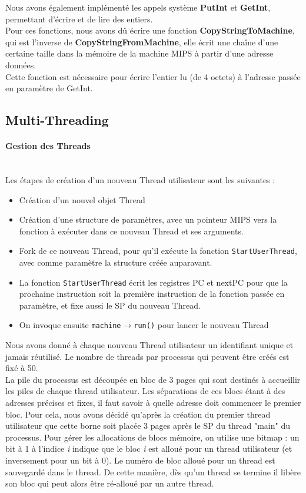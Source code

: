 \documentclass{report}
\newcommand{\myparagraph}[1]{\paragraph*{#1}\mbox{}\\}
\begin{document}
Nous avons également implémenté les appels système \textbf{PutInt} et \textbf{GetInt}, permettant d'écrire et de lire des entiers.\\
Pour ces fonctions, nous avons dû écrire une fonction \textbf{CopyStringToMachine}, qui est l'inverse de \textbf{CopyStringFromMachine}, elle écrit une chaîne d'une certaine taille dans la mémoire de la machine MIPS à partir d'une adresse données.\\
Cette fonction est nécessaire pour écrire l'entier lu (de 4 octets) à l'adresse passée en paramètre de GetInt.
\subsection*{Multi-Threading}
\myparagraph{Gestion des Threads}

\noindent
Les étapes de création d'un nouveau Thread utilisateur sont les suivantes : 
\begin{itemize}
	\item Création d'un nouvel objet Thread
	\item Création d'une structure de paramètres, avec un pointeur MIPS vers la fonction à exécuter dans ce nouveau Thread et ses arguments.
	\item Fork de ce nouveau Thread, pour qu'il exécute la fonction \texttt{StartUserThread}, avec comme paramètre la structure créée auparavant.
	\item La fonction \texttt{StartUserThread} écrit les registres PC et nextPC pour que la prochaine instruction soit la première instruction de la fonction passée en paramètre, et fixe aussi le SP du nouveau Thread.
	\item On invoque ensuite \texttt{machine$\rightarrow$run()} pour lancer le nouveau Thread
\end{itemize}

Nous avons donné à chaque nouveau Thread utilisateur un identifiant unique et jamais réutilisé. Le nombre de threads par processus qui peuvent être créés est fixé à 50.\\

La pile du processus est découpée en bloc de 3 pages qui sont destinés à accueillir les piles de chaque thread utilisateur. Les séparations de ces blocs étant à des adresses précises et fixes, il faut savoir à quelle adresse doit commencer le premier bloc. Pour cela, nous avons décidé qu'après la création du premier thread utilisateur que cette borne soit placée 3 pages après le SP du thread "main" du processus. Pour gérer les allocations de blocs mémoire, on utilise une bitmap : un bit à 1 à l'indice \textit{i} indique que le bloc \textit{i} est alloué pour un thread utilisateur (et inversement pour un bit à 0). Le numéro de bloc alloué pour un thread est sauvegardé dans le thread. De cette manière, dès qu'un thread se termine il libère son bloc qui peut alors être ré-alloué par un autre thread. \\ 
   
\end{document}
